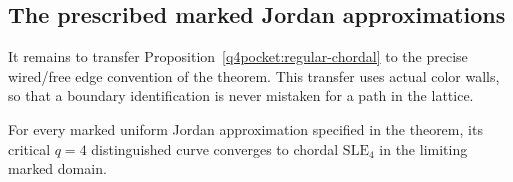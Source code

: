 \subsection{The prescribed marked Jordan approximations}

It remains to transfer Proposition~\ref{q4pocket:regular-chordal}
to the precise wired/free edge convention of the theorem.
This transfer uses actual color walls, so that a boundary
identification is never mistaken for a path in the lattice.

\begin{proposition}
\label{q4pocket:jordan-chordal}
For every marked uniform Jordan approximation specified in
the theorem, its critical $q=4$ distinguished curve converges
to chordal $\mathrm{SLE}_4$ in the limiting marked domain.
\end{proposition}

